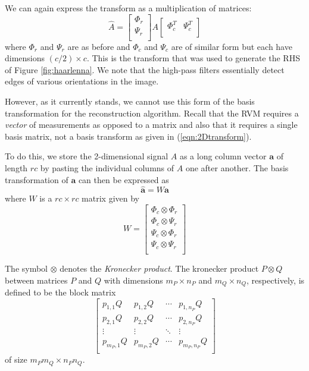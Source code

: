 \documentclass[final,3p]{report}
\let\bs\boldsymbol
\begin{document}
We can again express the transform as a multiplication of matrices:
\begin{equation}
\label{eqn:2Dtransform}
\hat A = \begin{bmatrix}
  \Phi_r\\
  \Psi_r\\
\end{bmatrix}
A
\begin{bmatrix}
  \Phi_c^T & \Psi_c^T\\
\end{bmatrix}
\end{equation}
where $\Phi_r$ and $\Psi_r$ are as before and $\Phi_c$ and $\Psi_c$ are of similar form but each have dimensions $(c/2)\times c$.
This is the transform that was used to generate the RHS of Figure \ref{fig:haarlenna}.
We note that the high-pass filters essentially detect edges of various orientations in the image.

However, as it currently stands, we cannot use this form of the basis transformation for the reconstruction algorithm. Recall that the RVM requires a \emph{vector} of measurements as opposed to a matrix and also that it requires a single basis matrix, not a basis transform as given in (\ref{eqn:2Dtransform}).

To do this, we store the 2-dimensional signal $A$ as a long column vector $\bs a$ of length $rc$ by pasting the individual columns of $A$ one after another.
The basis transformation of $\bs a$ can then be expressed as 
\begin{equation*}
\hat{\bs a} = W \bs a
\end{equation*}
where $W$ is a $rc \times rc $ matrix given by
\begin{equation*}
W = 
\begin{bmatrix}
\Phi_c \otimes \Phi_r \\
\Phi_c \otimes \Psi_r \\
\Psi_c \otimes \Phi_r \\
\Psi_c \otimes \Psi_r \\
\end{bmatrix}
\end{equation*}

The symbol $\otimes$ denotes the \emph{Kronecker product}. 
The kronecker product $P \otimes Q$ between matrices $P$ and $Q$ with dimensions $m_P \times n_P$ and $m_Q \times n_Q$, respectively,  is defined to be the block matrix
\begin{equation*}
\begin{bmatrix}
p_{1,1} Q & p_{1,2} Q & \cdots & p_{1,n_P} Q \\
p_{2,1} Q & p_{2,2} Q & \cdots & p_{2,n_P} Q \\
\vdots&\vdots&\ddots&\vdots \\
p_{m_P,1} Q & p_{m_P,2} Q & \cdots & p_{m_P,n_P} Q \\
\end{bmatrix}
\end{equation*}
of size $m_Pm_Q \times n_Pn_Q$.
\end{document}
